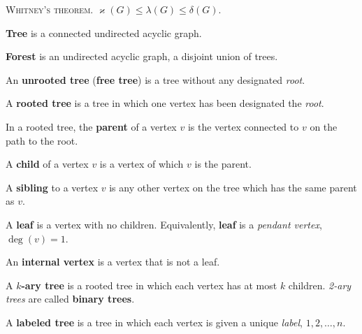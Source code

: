 \documentclass[a4paper,10pt]{article}
\newcommand{\op}[1]{\operatorname*{#1}}
\newcommand{\degree}[1]{\op{deg}(#1)}
\newcommand{\minDegree}[1]{\delta(#1)}
\newcommand{\vertexConnectivity}[1]{\varkappa(#1)}
\newcommand{\edgeConnectivity}[1]{\lambda(#1)}
\begin{document}
\begin{terms}
\begin{minipage}{\linewidth}
    \item \textsc{Whitney's theorem}. $\vertexConnectivity{G} \leq \edgeConnectivity{G} \leq \minDegree{G}$.

    \end{minipage}

    \item \textbf{Tree} is a connected undirected acyclic graph.
    \item \textbf{Forest} is an undirected acyclic graph, \ie a disjoint union of trees.

    \item An \textbf{unrooted tree} (\textbf{free tree}) is a tree without any designated \emph{root}.
    \item A \textbf{rooted tree} is a tree in which one vertex has been designated the \emph{root}.
    \begin{terms}
        \item In a rooted tree, the \textbf{parent} of a vertex $v$ is the vertex connected to $v$ on the path to the root.
        \item A \textbf{child} of a vertex $v$ is a vertex of which $v$ is the parent.
        \item A \textbf{sibling} to a vertex $v$ is any other vertex on the tree which has the same parent as $v$.


        \item A \textbf{leaf} is a vertex with no children. Equivalently, \textbf{leaf} is a \emph{pendant vertex}, \ie $\degree{v} = 1$.
        \item An \textbf{internal vertex} is a vertex that is not a leaf.

        \item A \textbf{$k$-ary tree} is a rooted tree in which each vertex has at most $k$ children. \emph{2-ary trees} are called \textbf{binary trees}.
    \end{terms}

    \item A \textbf{labeled tree} is a tree in which each vertex is given a unique \emph{label}, \eg $1, 2, \dotsc, n$.


\end{terms}
\end{document}
